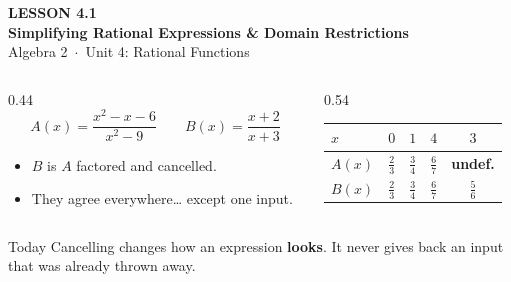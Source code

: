 \documentclass[aspectratio=169, 11pt]{beamer}
\begin{document}
{
\begin{frame}[plain]
  \vspace{2.8cm}\hspace{0.55cm}%
  \begin{minipage}{0.9\textwidth}
    {\color{goldacc}\bfseries\small LESSON 4.1}\\[0.5cm]
    {\color{white}\bfseries\LARGE Simplifying Rational Expressions \& Domain Restrictions}\\[1.2cm]
    {\color{forestmid}\small Algebra 2~$\cdot$~Unit 4: Rational Functions}
  \end{minipage}
\end{frame}
}

\begin{frame}[t, plain]
  \begin{columns}[T]
    \begin{column}{0.44\textwidth}
      \[ A(x)=\frac{x^2-x-6}{x^2-9} \qquad B(x)=\frac{x+2}{x+3} \]
      \vspace{-6pt}
      \begin{itemize}\setlength{\itemsep}{4pt}
        \item $B$ is $A$ factored and cancelled.
        \item They agree everywhere\dots{} except one input.
      \end{itemize}
    \end{column}
    \begin{column}{0.54\textwidth}
      \centering
      \renewcommand{\arraystretch}{1.4}
      \begin{tabular}{|l|c|c|c|c|}
      \hline
      $x$ & $0$ & $1$ & $4$ & $3$ \\ \hline
      $A(x)$ & $\frac23$ & $\frac34$ & $\frac67$ & \textbf{undef.} \\ \hline
      $B(x)$ & $\frac23$ & $\frac34$ & $\frac67$ & $\frac56$ \\ \hline
      \end{tabular}
    \end{column}
  \end{columns}
  \vspace{6pt}
  \begin{block}{Today}
    Cancelling changes how an expression \textbf{looks}. It never gives back an input that was already
    thrown away.
  \end{block}
\end{frame}
\end{document}
